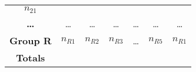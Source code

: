 \documentclass[]{book}
\theoremstyle{definition}
\theoremstyle{definition}
\theoremstyle{remark}
\begin{document}
\begin{longtable}[]{@{}ccccccc@{}}
\begin{minipage}[t]{0.14\columnwidth}
\(n_{21}\)\strut
\end{minipage}\tabularnewline
\begin{minipage}[t]{0.06\columnwidth}\centering\strut
\textbf{\ldots{}}\strut
\end{minipage} & \begin{minipage}[t]{0.14\columnwidth}\centering\strut
\ldots{}\strut
\end{minipage} & \begin{minipage}[t]{0.14\columnwidth}\centering\strut
\ldots{}\strut
\end{minipage} & \begin{minipage}[t]{0.14\columnwidth}\centering\strut
\ldots{}\strut
\end{minipage} & \begin{minipage}[t]{0.05\columnwidth}\centering\strut
\ldots{}\strut
\end{minipage} & \begin{minipage}[t]{0.14\columnwidth}\centering\strut
\ldots{}\strut
\end{minipage} & \begin{minipage}[t]{0.14\columnwidth}\centering\strut
\ldots{}\strut
\end{minipage}\tabularnewline
\begin{minipage}[t]{0.06\columnwidth}\centering\strut
\textbf{Group R}\strut
\end{minipage} & \begin{minipage}[t]{0.14\columnwidth}\centering\strut
\(n_{R1}\)\strut
\end{minipage} & \begin{minipage}[t]{0.14\columnwidth}\centering\strut
\(n_{R2}\)\strut
\end{minipage} & \begin{minipage}[t]{0.14\columnwidth}\centering\strut
\(n_{R3}\)\strut
\end{minipage} & \begin{minipage}[t]{0.05\columnwidth}\centering\strut
\ldots{}\strut
\end{minipage} & \begin{minipage}[t]{0.14\columnwidth}\centering\strut
\(n_{R5}\)\strut
\end{minipage} & \begin{minipage}[t]{0.14\columnwidth}\centering\strut
\(n_{R1}\)\strut
\end{minipage}\tabularnewline
\begin{minipage}[t]{0.06\columnwidth}\centering\strut
\textbf{Totals}\strut
\end{minipage} & \begin{minipage}[t]{0.14\columnwidth}\centering\strut

\end{minipage}
\end{longtable}
\end{document}
